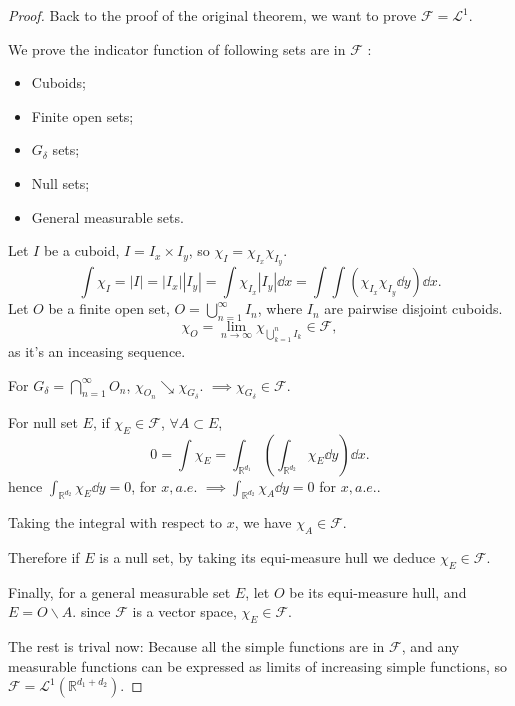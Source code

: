 \begin{proof}[Proof]
	Back to the proof of the original theorem, we want to prove
	$\mathscr{F} = \mathcal{L}^1$.

	We prove the indicator function of following sets are in $\mathscr{F}$ :
	\begin{itemize}
		\item Cuboids;
		\item Finite open sets;
		\item $G_\delta$ sets;
		\item Null sets;
		\item General measurable sets.
	\end{itemize}

	Let $I$ be a cuboid,  $I = I_x \times I_y$, so $\chi_I = \chi_{I_x}\chi_{I_y}$.
	\[
	\int \chi_I = |I| = |I_x||I_y|
	= \int \chi_{I_x}|I_y|\dd x = \int \int (\chi_{I_x}\chi_{I_y}\dd y)\dd x.
	\]
	Let $O$ be a finite open set,  $O=\bigcup_{n=1}^\infty I_n$,
	where $I_n$ are pairwise disjoint cuboids.
	\[
	\chi_O = \lim_{n\to \infty}\chi_{\bigcup_{k=1}^n I_k} \in \mathscr{F},
	\]
	as it's an inceasing sequence.

	For $G_\delta = \bigcap_{n=1}^\infty O_n$, $\chi_{O_n}\searrow \chi_{G_\delta}$.
	$ \implies \chi_{G_\delta}\in \mathscr{F}$.

	For null set  $E$, if $\chi_E\in \mathscr{F}$, $\forall A \subset E$,
	\[
	0 = \int \chi_E =
	\int_{\mathbb{R}^{d_1}}\left( \int_{\mathbb{R}^{d_2}}\chi_E\dd y \right)\dd x.
	\]
	hence $\int_{\mathbb{R}^{d_2}} \chi_E\dd y = 0$, for $x,a.e.$
	$ \implies \int_{\mathbb{R}^{d_2}}\chi_A\dd y = 0$ for $x,a.e.$.

	Taking the integral with respect to $x$, we have  $\chi_A\in \mathscr{F}$.

	Therefore if $E$ is a null set, by taking its equi-measure hull
	we deduce  $\chi_E\in \mathscr{F}$.

	Finally, for a general measurable set $E$,
	let  $O$ be its equi-measure hull, and  $E=O\backslash A$.
	since  $\mathscr{F}$ is a vector space, $\chi_E\in \mathscr{F}$.

	The rest is trival now:
	Because all the simple functions are in $\mathscr{F}$,
	and any measurable functions can be expressed as limits of
	increasing simple functions, so $\mathscr{F} = \mathcal{L}^1(\mathbb{R}^{d_1+d_2})$.
\end{proof}

